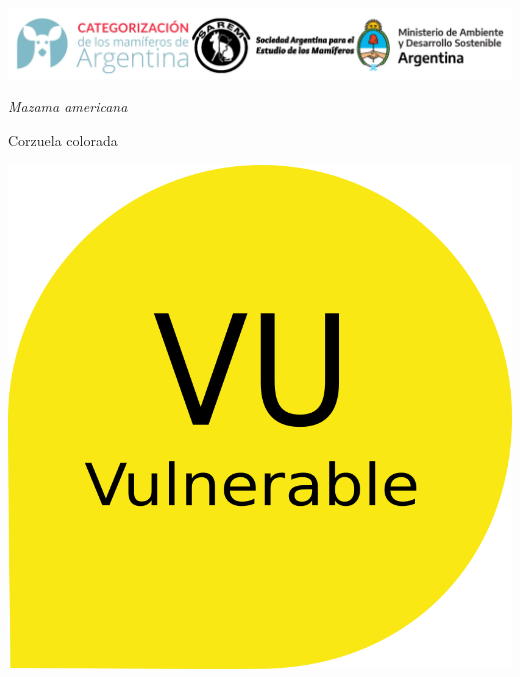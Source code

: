 \documentclass[
  x11names]{article}
\author{}
\date{\vspace{-2.5em}Fecha de creación: 03 April, 2023}
\begin{document}
\setmainfont{Arial}
\setsansfont{Arial}
\setmonofont{Arial}

\newcommand\invisiblesection[1]{%
  \refstepcounter{section}%
  \addcontentsline{toc}{section}{\protect\numberline{\thesection}#1}%
  \sectionmark{#1}}


%
\vspace{-0.4cm}

\includegraphics[width=1\linewidth]{images/Base_info/logo}

\vspace{1cm}

\begin{minipage}{0.7\textwidth}
\vspace{0.3cm}
\fontsize{20}{24}\selectfont\textit{Mazama americana}

\vspace{0.3cm}
\fontsize{30}{36}\selectfont Corzuela colorada
\end{minipage}
\hspace{0.05\textwidth}
\begin{minipage}{0.25\textwidth}
\includegraphics[width=\textwidth]{images/vu.png}
\end{minipage}
\end{document}
